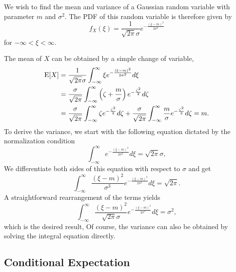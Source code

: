 \begin{example}
We wish to find the mean and variance of a Gaussian random variable with parameter $m$ and $\sigma^2$.
The PDF of this random variable is therefore given by
\begin{equation*}
f_X (\xi) = \frac{1}{\sqrt{2 \pi} \sigma} e^{-\frac{(\xi - m)^2}{2\sigma^2}}
\end{equation*}
for $- \infty < \xi < \infty$.

The mean of $X$ can be obtained by a simple change of variable,
\begin{equation*}
\begin{split}
\mathrm{E} [X]
&= \frac{1}{\sqrt{2 \pi} \sigma} \int_{- \infty}^{\infty} \xi e^{-\frac{(\xi-m)^2}{2\sigma^2}} d\xi \\
&= \frac{\sigma}{\sqrt{2 \pi}} \int_{- \infty}^{\infty}
\left( \zeta+\frac{m}{\sigma} \right) e^{-\frac{\zeta^2}{2}} d\zeta \\
&= \frac{\sigma}{\sqrt{2 \pi}} \int_{- \infty}^{\infty}
\zeta e^{-\frac{\zeta^2}{2}} d\zeta
+ \frac{\sigma}{\sqrt{2 \pi}} \int_{- \infty}^{\infty}
\frac{m}{\sigma} e^{-\frac{\zeta^2}{2}} d\zeta
= m.
\end{split}
\end{equation*}
To derive the variance, we start with the following equation dictated by the normalization condition
\begin{equation*}
\int_{-\infty}^{\infty} e^{- \frac{(\xi-m)^2}{2 \sigma^2}} d\xi
= \sqrt{2 \pi} \sigma ,
\end{equation*}
We differentiate both sides of this equation with respect to $\sigma$ and get
\begin{equation*}
\int_{-\infty}^{\infty} \frac{(\xi-m)^2}{\sigma^3}
e^{- \frac{(\xi-m)^2}{2 \sigma^2}} d\xi
= \sqrt{2 \pi} .
\end{equation*}
A straightforward rearrangement of the terms yields
\begin{equation*}
\int_{-\infty}^{\infty} \frac{(\xi-m)^2}{\sqrt{2 \pi} \sigma}
e^{- \frac{(\xi-m)^2}{2 \sigma^2}} d\xi
= \sigma^2 ,
\end{equation*}
which is the desired result,
Of course, the variance can also be obtained by solving the integral equation directly.
\end{example}


\subsection{Conditional Expectation}

